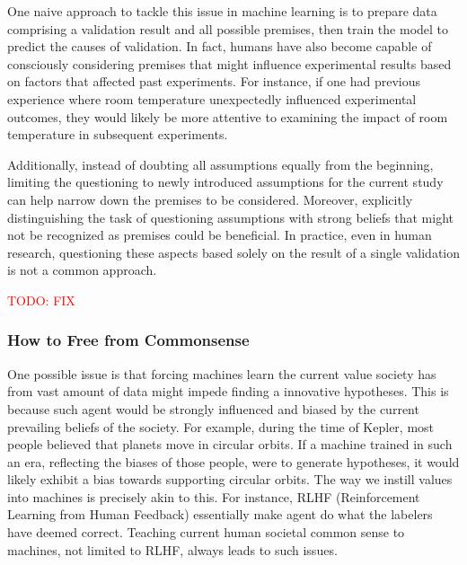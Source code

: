 \documentclass{book}
\begin{document}
One naive approach to tackle this issue in machine learning is to prepare data comprising a validation result and all possible premises, then train the model to predict the causes of validation. In fact, humans have also become capable of consciously considering premises that might influence experimental results based on factors that affected past experiments. For instance, if one had previous experience where room temperature unexpectedly influenced experimental outcomes, they would likely be more attentive to examining the impact of room temperature in subsequent experiments.

Additionally, instead of doubting all assumptions equally from the beginning, limiting the questioning to newly introduced assumptions for the current study can help narrow down the premises to be considered. Moreover, explicitly distinguishing the task of questioning assumptions with strong beliefs that might not be recognized as premises could be beneficial. In practice, even in human research, questioning these aspects based solely on the result of a single validation is not a common approach.

\textcolor{red}{TODO: FIX}

\subsubsection{How to Free from Commonsense}

One possible issue is that forcing machines learn the current value society has from vast amount of data might impede finding a innovative hypotheses. This is because such agent would be strongly influenced and biased by the current prevailing beliefs of the society. For example, during the time of Kepler, most people believed that planets move in circular orbits. If a machine trained in such an era, reflecting the biases of those people, were to generate hypotheses, it would likely exhibit a bias towards supporting circular orbits. The way we instill values into machines is precisely akin to this. For instance, RLHF (Reinforcement Learning from Human Feedback) essentially make agent do what the labelers have deemed correct. Teaching current human societal common sense to machines, not limited to RLHF, always leads to such issues.
 
\end{document}

